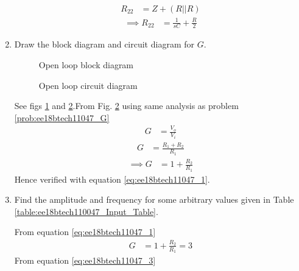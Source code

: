 \begin{enumerate}[label=\thesection.\arabic*.,ref=\thesection.\theenumi]
\begin{align}
R_{22} &= Z + (R||R)
\end{align}
\begin{align}
\implies R_{22} &= \frac{1}{sC} + \frac{R}{2}   
\end{align}
%
\item Draw the block diagram and circuit diagram for $G$.\\
\renewcommand{\thefigure}{\theenumi.\arabic{figure}}
%
\begin{figure}[!ht]
	\begin{center}
		\resizebox{\columnwidth}{!}{}
	\end{center}
\caption{Open loop block diagram}
\label{fig:ee18btech11047_fig6}
\end{figure}
%
\begin{figure}[!ht]
	\begin{center}
		\resizebox{\columnwidth}{!}{}
	\end{center}
\caption{Open loop circuit diagram}
\label{fig:ee18btech11047_fig7}
\end{figure}
\renewcommand{\thefigure}{\theenumi}
\solution See figs \ref{fig:ee18btech11047_fig6} and \ref{fig:ee18btech11047_fig7}.From Fig. \ref{fig:ee18btech11047_fig7} using same analysis as problem \ref{prob:ee18btech11047_G}
\begin{align}
G &= \frac{V_{o}}{V_{i}}
\end{align}
\begin{align}
G &= \frac{R_{1} + R_{2}}{R_{1}}
\end{align}
\begin{align}
\implies G &= 1+\frac{R_{2}}{R_{1}}
\end{align}
Hence verified with equation \eqref{eq:ee18btech11047_1}.
\item Find the amplitude and frequency for some arbitrary values given in Table \ref{table:ee18btech110047_Input_Table}.\\
\begin{table}[!ht]
\centering

\caption{}
\label{table:ee18btech110047_Input_Table}
\end{table}
\solution From equation \eqref{eq:ee18btech11047_1} 
\begin{align}
G &= 1 + \frac{R_{2}}{R_{1}} = 3
\end{align}
From equation \eqref{eq:ee18btech11047_3}
\begin{align}

\end{align}
\end{enumerate}

